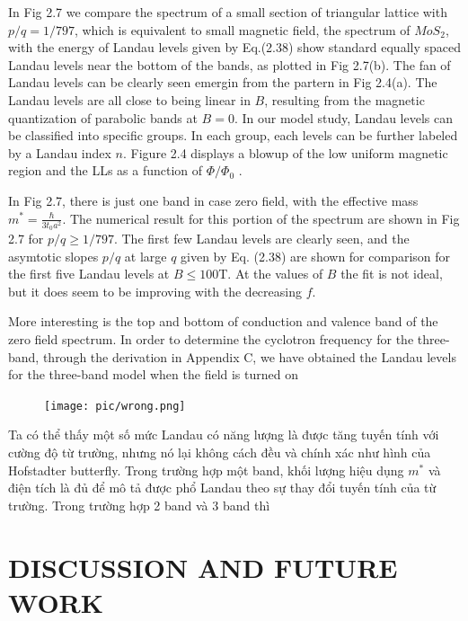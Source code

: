 \documentclass{report}
\begin{document}
In Fig 2.7 we compare the spectrum of a small section of triangular lattice with $p / q = 1 / 797$, which is equivalent to small magnetic field, the spectrum of $MoS_{2}$, with the energy of Landau levels given by Eq.(2.38) show standard equally spaced Landau levels \cite{Shoenberg_1984,singleton2001band,blundell2001magnetism,kittel1987quantum} near the bottom of the bands, as plotted in Fig 2.7(b). The fan of Landau levels can be clearly seen emergin from the partern in Fig 2.4(a). The Landau levels are all close to being linear in $B$, resulting from the magnetic quantization of parabolic bands at $B = 0$. In our model study, Landau levels can be classified into specific groups. In each group, each levels can be further labeled by a Landau index $n$. Figure 2.4 displays a blowup of the low uniform magnetic region and the LLs as a function of $\Phi / \Phi_{0}$ \cite{Li_2011}.

In Fig 2.7, there is just one band in case zero field, with the effective mass $m^{*} = \frac{\hbar}{3 t_{0} a^{2}}$. The numerical result for this portion of the spectrum are shown in Fig 2.7 for $p/q \geq 1/797$. The first few Landau levels are clearly seen, and the asymtotic slopes $p/q$ at large $q$ given by Eq. (2.38) are shown for comparison for the first five Landau levels at $B \leq 100$T. At the values of $B$ the fit is not ideal, but it does seem to be improving with the decreasing $f$.

More interesting is the top and bottom of conduction and valence band of the zero field spectrum. In order to determine the cyclotron frequency for the three-band, through the derivation in Appendix C, we have obtained the Landau levels for the three-band model when the field is turned on
\begin{figure}[H]
	\centering
	\texttt{[image: pic/wrong.png]}
	\caption{\label{fig:wrong}}
\end{figure}
Ta có thể thấy một số mức Landau có năng lượng là được tăng tuyến tính với cường độ từ trường, nhưng nó lại không cách đều và chính xác như hình của Hofstadter butterfly. Trong trường hợp một band, khối lượng hiệu dụng $m^{*}$ và điện tích là đủ để mô tả được phổ Landau theo sự thay đổi tuyến tính của từ trường. Trong trường hợp 2 band và 3 band thì 



\chapter{DISCUSSION AND FUTURE WORK}
\end{document}

